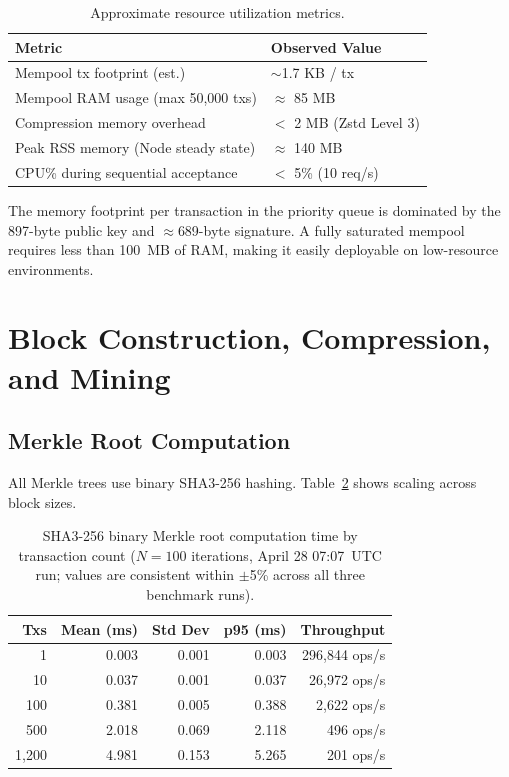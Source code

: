 \documentclass[11pt,a4paper]{article}
\begin{document}
\begin{table}[h]
\centering\small
\begin{tabular}{@{}ll@{}}
\toprule
\textbf{Metric} & \textbf{Observed Value} \\
\midrule
Mempool tx footprint (est.) & $\sim$1.7 KB / tx \\
Mempool RAM usage (max 50,000 txs) & $\approx$ 85 MB \\
Compression memory overhead & $<$ 2 MB (Zstd Level 3) \\
Peak RSS memory (Node steady state) & $\approx$ 140 MB \\
CPU\% during sequential acceptance & $<$ 5\% (10 req/s) \\
\bottomrule
\end{tabular}
\caption{Approximate resource utilization metrics.}
\label{tab:resource}
\end{table}

The memory footprint per transaction in the priority queue is dominated by the 897-byte public key and $\approx$689-byte signature. A fully saturated mempool requires less than 100~MB of RAM, making it easily deployable on low-resource environments.

\section{Block Construction, Compression, and Mining}
\label{sec:block}
\subsection{Merkle Root Computation}

All Merkle trees use binary SHA3-256 hashing. Table~\ref{tab:merkle} shows
scaling across block sizes.

\begin{table}[h]
\centering
\small
\begin{tabular}{@{}rrrrr@{}}
\toprule
\textbf{Txs} & \textbf{Mean (ms)} & \textbf{Std Dev} & \textbf{p95 (ms)} & \textbf{Throughput} \\
\midrule
1    & 0.003 & 0.001 & 0.003 & 296,844 ops/s \\
10   & 0.037 & 0.001 & 0.037 & 26,972 ops/s \\
100  & 0.381 & 0.005 & 0.388 & 2,622 ops/s \\
500  & 2.018 & 0.069 & 2.118 & 496 ops/s \\
1,200 & 4.981 & 0.153 & 5.265 & 201 ops/s \\
\bottomrule
\end{tabular}
\caption{SHA3-256 binary Merkle root computation time by transaction count
($N=100$ iterations, April 28 07:07~UTC run; values are consistent within
$\pm$5\% across all three benchmark runs).}
\label{tab:merkle}
\end{table}
\end{document}
